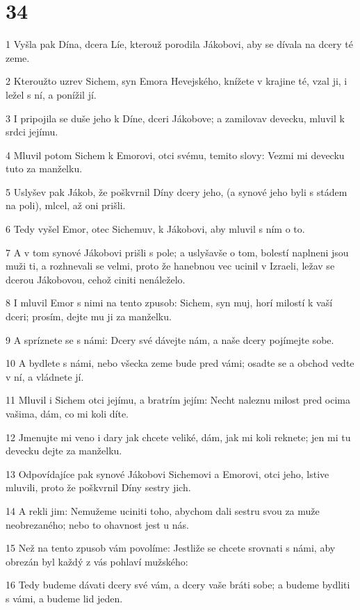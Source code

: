 \chapter{34}

\par 1 Vyšla pak Dína, dcera Líe, kterouž porodila Jákobovi, aby se dívala na dcery té zeme.
\par 2 Kteroužto uzrev Sichem, syn Emora Hevejského, knížete v krajine té, vzal ji, i ležel s ní, a ponížil jí.
\par 3 I pripojila se duše jeho k Díne, dceri Jákobove; a zamilovav devecku, mluvil k srdci jejímu.
\par 4 Mluvil potom Sichem k Emorovi, otci svému, temito slovy: Vezmi mi devecku tuto za manželku.
\par 5 Uslyšev pak Jákob, že poškvrnil Díny dcery jeho, (a synové jeho byli s stádem na poli), mlcel, až oni prišli.
\par 6 Tedy vyšel Emor, otec Sichemuv, k Jákobovi, aby mluvil s ním o to.
\par 7 A v tom synové Jákobovi prišli s pole; a uslyšavše o tom, bolestí naplneni jsou muži ti, a rozhnevali se velmi, proto že hanebnou vec ucinil v Izraeli, ležav se dcerou Jákobovou, cehož ciniti nenáleželo.
\par 8 I mluvil Emor s nimi na tento zpusob: Sichem, syn muj, horí milostí k vaší dceri; prosím, dejte mu ji za manželku.
\par 9 A spríznete se s námi: Dcery své dávejte nám, a naše dcery pojímejte sobe.
\par 10 A bydlete s námi, nebo všecka zeme bude pred vámi; osadte se a obchod vedte v ní, a vládnete jí.
\par 11 Mluvil i Sichem otci jejímu, a bratrím jejím: Necht naleznu milost pred ocima vašima, dám, co mi koli díte.
\par 12 Jmenujte mi veno i dary jak chcete veliké, dám, jak mi koli reknete; jen mi tu devecku dejte za manželku.
\par 13 Odpovídajíce pak synové Jákobovi Sichemovi a Emorovi, otci jeho, lstive mluvili, proto že poškvrnil Díny sestry jich.
\par 14 A rekli jim: Nemužeme uciniti toho, abychom dali sestru svou za muže neobrezaného; nebo to ohavnost jest u nás.
\par 15 Než na tento zpusob vám povolíme: Jestliže se chcete srovnati s námi, aby obrezán byl každý z vás pohlaví mužského:
\par 16 Tedy budeme dávati dcery své vám, a dcery vaše bráti sobe; a budeme bydliti s vámi, a budeme lid jeden.
